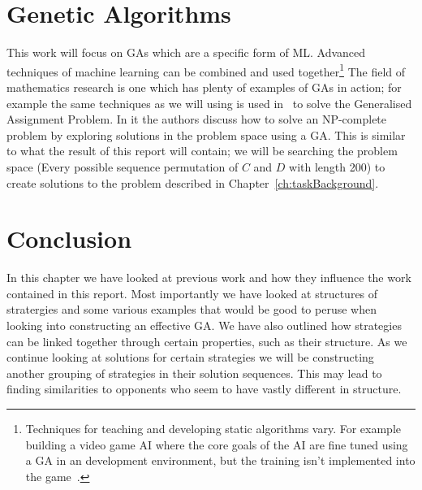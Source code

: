 \section{Genetic Algorithms}
This work will focus on GAs which are a specific form of ML.
Advanced techniques of machine learning can be combined and used together\footnote{Techniques for teaching and developing static algorithms vary. For example building a video game AI where the core goals of the AI are fine tuned using a GA in an development environment, but the training isn't implemented into the game~\cite{bakkes2009rapid}.}
The field of mathematics research is one which has plenty of examples of GAs in action;
for example the same techniques as we will using is used in~\cite{chu1997genetic} to solve the Generalised Assignment Problem.
In it the authors discuss how to solve an NP-complete problem by exploring solutions in the problem space using a GA.
This is similar to what the result of this report will contain;
we will be searching the problem space (Every possible sequence permutation of $C$ and $D$ with length 200) to create solutions to the problem described in Chapter~\ref{ch:taskBackground}.


\section{Conclusion}
In this chapter we have looked at previous work and how they influence the work contained in this report.
Most importantly we have looked at structures of stratergies and some various examples that would be good to peruse when looking into constructing an effective GA.
We have also outlined how strategies can be linked together through certain properties, such as their structure.
As we continue looking at solutions for certain strategies we will be constructing another grouping of strategies in their solution sequences.
This may lead to finding similarities to opponents who seem to have vastly different in structure.

